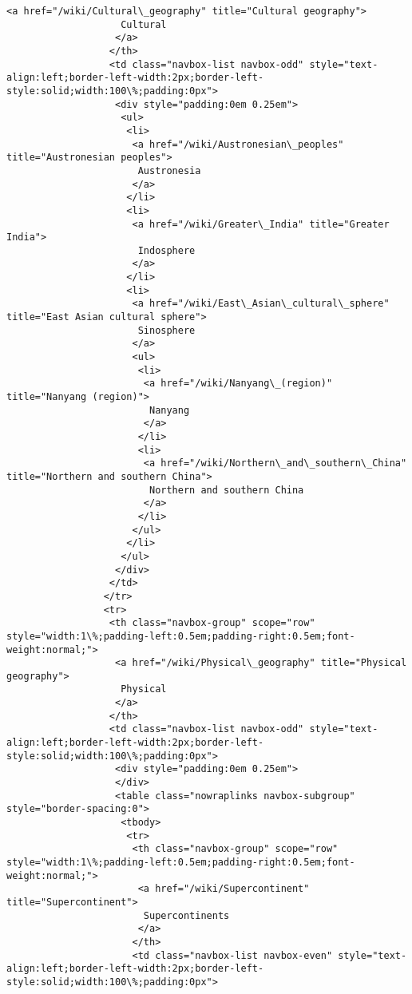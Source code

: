 \documentclass[11pt]{article}
\begin{document}
\begin{Verbatim}[commandchars=\\\{\}]
                   <a href="/wiki/Cultural\_geography" title="Cultural geography">
                    Cultural
                   </a>
                  </th>
                  <td class="navbox-list navbox-odd" style="text-align:left;border-left-width:2px;border-left-style:solid;width:100\%;padding:0px">
                   <div style="padding:0em 0.25em">
                    <ul>
                     <li>
                      <a href="/wiki/Austronesian\_peoples" title="Austronesian peoples">
                       Austronesia
                      </a>
                     </li>
                     <li>
                      <a href="/wiki/Greater\_India" title="Greater India">
                       Indosphere
                      </a>
                     </li>
                     <li>
                      <a href="/wiki/East\_Asian\_cultural\_sphere" title="East Asian cultural sphere">
                       Sinosphere
                      </a>
                      <ul>
                       <li>
                        <a href="/wiki/Nanyang\_(region)" title="Nanyang (region)">
                         Nanyang
                        </a>
                       </li>
                       <li>
                        <a href="/wiki/Northern\_and\_southern\_China" title="Northern and southern China">
                         Northern and southern China
                        </a>
                       </li>
                      </ul>
                     </li>
                    </ul>
                   </div>
                  </td>
                 </tr>
                 <tr>
                  <th class="navbox-group" scope="row" style="width:1\%;padding-left:0.5em;padding-right:0.5em;font-weight:normal;">
                   <a href="/wiki/Physical\_geography" title="Physical geography">
                    Physical
                   </a>
                  </th>
                  <td class="navbox-list navbox-odd" style="text-align:left;border-left-width:2px;border-left-style:solid;width:100\%;padding:0px">
                   <div style="padding:0em 0.25em">
                   </div>
                   <table class="nowraplinks navbox-subgroup" style="border-spacing:0">
                    <tbody>
                     <tr>
                      <th class="navbox-group" scope="row" style="width:1\%;padding-left:0.5em;padding-right:0.5em;font-weight:normal;">
                       <a href="/wiki/Supercontinent" title="Supercontinent">
                        Supercontinents
                       </a>
                      </th>
                      <td class="navbox-list navbox-even" style="text-align:left;border-left-width:2px;border-left-style:solid;width:100\%;padding:0px">

\end{Verbatim}
\end{document}
